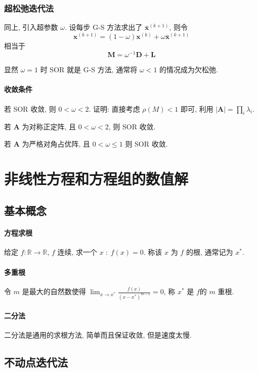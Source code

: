 \documentclass{ctexart}
\newcommand{\Rset}{\mathbb{R}}
\begin{document}
\subsubsection{超松弛迭代法}
    同上, 引入超参数 $\omega$. 设每步 G-S 方法求出了 $\bar{\mathbf{x}}^{(k+1)}$, 则令 \[
        \mathbf{x}^{(k+1)} = (1 - \omega) \mathbf{x}^{(k)} + \omega \bar{\mathbf{x}}^{(k+1)}\]
    相当于 \[
        \mathbf{M} = \omega^{-1} \mathbf{D} + \mathbf{L} \]
    \par
    显然 $\omega = 1$ 时 SOR 就是 G-S 方法, 通常将 $\omega < 1$ 的情况成为欠松弛.\par
\paragraph{收敛条件}
    若 SOR 收敛, 则 $0 < \omega < 2$. 证明: 直接考虑 $\rho(M) < 1$ 即可, 利用 $|\mathbf{A}| = \prod_i \lambda_i$.\par
    若 $\mathbf{A}$ 为对称正定阵, 且 $0 < \omega < 2$, 则 SOR 收敛.\par
    若 $\mathbf{A}$ 为严格对角占优阵, 且 $0 < \omega \le 1$ 则 SOR 收敛.

\section{非线性方程和方程组的数值解}
\subsection{基本概念}
\paragraph{方程求根}
    给定 $f: \Rset \to \Rset$, $f$ 连续, 求一个 $x\;:\; f(x) = 0$.
    称该 $x$ 为 $f$ 的根, 通常记为 $x^*$.
\paragraph{多重根}
    令 $m$ 是最大的自然数使得 $\lim_{x \to x^*} \frac{f(x)}{(x-x^*)^{m-1}} = 0$,
    称 $x^*$ 是 $f$的 $m$ 重根.
\paragraph{二分法}
    二分法是通用的求根方法, 简单而且保证收敛, 但是速度太慢.

\subsection{不动点迭代法}
\end{document}
